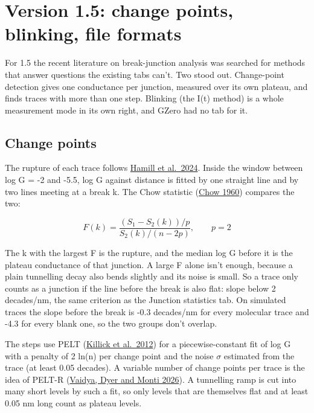 \documentclass[
  11pt,
  a4paper,
]{article}
\begin{document}
\hypertarget{version-1.5-change-points-blinking-file-formats}{%
\section{Version 1.5: change points, blinking, file
formats}\label{version-1.5-change-points-blinking-file-formats}}

For 1.5 the recent literature on break-junction analysis was searched
for methods that answer questions the existing tabs can't. Two stood
out. Change-point detection gives one conductance per junction, measured
over its own plateau, and finds traces with more than one step. Blinking
(the I(t) method) is a whole measurement mode in its own right, and
GZero had no tab for it.

\hypertarget{change-points}{%
\subsection{Change points}\label{change-points}}

The rupture of each trace follows
\href{https://arxiv.org/abs/2401.12769}{Hamill et al.~2024}. Inside the
window between log G = -2 and -5.5, log G against distance is fitted by
one straight line and by two lines meeting at a break k. The Chow
statistic (\href{https://doi.org/10.2307/1910133}{Chow 1960}) compares
the two:

\[
F(k) = \frac{\left(S_1 - S_2(k)\right)/p}{S_2(k)/(n - 2p)}, \qquad p = 2
\]

The k with the largest F is the rupture, and the median log G before it
is the plateau conductance of that junction. A large F alone isn't
enough, because a plain tunnelling decay also bends slightly and its
noise is small. So a trace only counts as a junction if the line before
the break is also flat: \textbar slope\textbar{} below 2 decades/nm, the
same criterion as the Junction statistics tab. On simulated traces the
slope before the break is -0.3 decades/nm for every molecular trace and
-4.3 for every blank one, so the two groups don't overlap.

The steps use PELT
(\href{https://doi.org/10.1080/01621459.2012.737745}{Killick et
al.~2012}) for a piecewise-constant fit of log G with a penalty of 2
ln(n) per change point and the noise $\sigma$ estimated from the trace
(at least 0.05 decades). A variable number of change points per trace is
the idea of PELT-R
(\href{https://meetings-archive.aps.org/smt/2026/mar-s71/8/}{Vaidya,
Dyer and Monti 2026}). A tunnelling ramp is cut into many short levels
by such a fit, so only levels that are themselves flat and at least 0.05
nm long count as plateau levels.
\end{document}
